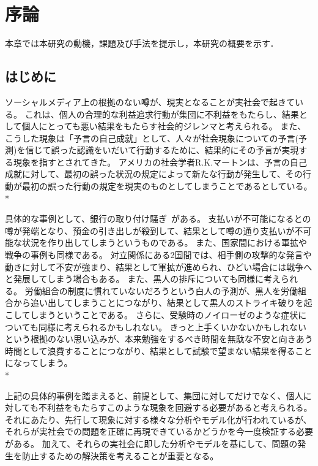 \chapter{序論}
\label{introduction}

本章では本研究の動機，課題及び手法を提示し，本研究の概要を示す．

\section{はじめに}
\label{introduction:background}

ソーシャルメディア上の根拠のない噂が、現実となることが実社会で起きている。
これは、個人の合理的な利益追求行動が集団に不利益をもたらし、結果として個人にとっても悪い結果をもたらす社会的ジレンマと考えられる。
また、こうした現象は「予言の自己成就」として、人々が社会現象についての予言(予測)を信じて誤った認識をいだいて行動するために、結果的にその予言が実現する現象を指すとされてきた。
アメリカの社会学者R.K.マートンは、予言の自己成就に対して、最初の誤った状況の規定によって新たな行動が発生して、その行動が最初の誤った行動の規定を現実のものとしてしまうことであるとしている。\\*
 
具体的な事例として、銀行の取り付け騒ぎ~\cite{}がある。
支払いが不可能になるとの噂が発端となり、預金の引き出しが殺到して、結果として噂の通り支払いが不可能な状況を作り出してしまうというものである。
また、国家間における軍拡や戦争の事例も同様である。
対立関係にある2国間では、相手側の攻撃的な発言や動きに対して不安が強まり、結果として軍拡が進められ、ひどい場合には戦争へと発展してしまう場合もある。
また、黒人の排斥についても同様に考えられる。
労働組合の制度に慣れていないだろうという白人の予測が、黒人を労働組合から追い出してしまうことにつながり、結果として黒人のストライキ破りを起こしてしまうということである。
さらに、受験時のノイローゼのような症状についても同様に考えられるかもしれない。
きっと上手くいかないかもしれないという根拠のない思い込みが、本来勉強をするべき時間を無駄な不安と向きあう時間として浪費することにつながり、結果として試験で望まない結果を得ることになってしまう。\\*
 
上記の具体的事例を踏まえると、前提として、集団に対してだけでなく、個人に対しても不利益をもたらすこのような現象を回避する必要があると考えられる。
それにあたり、先行して現象に対する様々な分析やモデル化が行われているが、それらが実社会での問題を正確に再現できているかどうかを今一度検証する必要がある。
加えて、それらの実社会に即した分析やモデルを基にして、問題の発生を防止するための解決策を考えることが重要となる。

